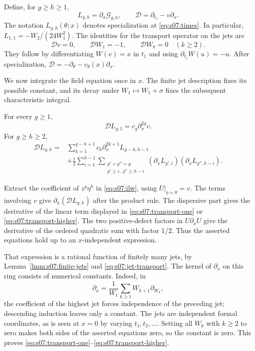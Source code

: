 Define, for $g\geq h\geq1$,
\begin{equation}\label{eq:s07:transport-definitions}
 L_{g,h}=\partial_x\mathcal G_{g,h},\qquad
 \mathscr D=\partial_{t_1}-v\partial_x.
\end{equation}
The notation $L_{g,h}(\theta;x)$ denotes specialization at
\eqref{eq:s07:times}. In particular,
$L_{1,1}=-W_2/(24W_1^2)$.
The identities for the transport operator on the jets are
\begin{equation}\label{eq:s07:jet-transport}
 \mathscr Dv=0,\qquad
 \mathscr DW_1=-1,\qquad \mathscr DW_k=0\quad(k\geq2).
\end{equation}
They follow by differentiating $W(v)=x$ in $t_1$ and using
$\partial_{t_1}W(u)=-u$. After specialization,
$\mathscr D=-\partial_\theta-v_\theta(x)\partial_x$.

We now integrate the field equation once in $x$. The finite jet
description fixes its possible constant, and its decay under
$W_1\mapsto W_1+\sigma$ fixes the subsequent characteristic integral.

\begin{prp}\label{prp:s07:transport}
For every $g\geq1$,
\begin{equation}\label{eq:s07:transport-one}
 \mathscr DL_{g,1}=c_g\partial_x^{2g}v.
\end{equation}
For $g\geq h\geq2$,
\begin{equation}\label{eq:s07:transport-higher}
 \begin{aligned}
 \mathscr DL_{g,h}
 ={}&\sum_{k=1}^{g-h+1}c_k\partial_x^{2k+1}L_{g-k,h-1}\\
 &+\frac12\sum_{i=1}^{h-1}
   \sum_{\substack{g'+g''=g\\g'\geq i,\ g''\geq h-i}}
       (\partial_xL_{g',i})(\partial_xL_{g'',h-i}).
 \end{aligned}
\end{equation}
\end{prp}
\begin{prf}
Extract the coefficient of $z^g\eta^h$ in
\eqref{eq:s07:ilw}, using $U|_{\eta=0}=v$. The terms involving
$v$ give $\partial_x(\mathscr DL_{g,h})$ after the product rule.
The dispersive part gives the derivative of the linear term displayed
in \eqref{eq:s07:transport-one} or
\eqref{eq:s07:transport-higher}. The two positive-defect factors
in $U\partial_xU$ give the derivative of the ordered quadratic sum
with factor $1/2$. Thus the asserted equations hold up to an
$x$-independent expression.

That expression is a rational function of finitely many jets, by
Lemma~\ref{lmm:s07:finite-jets} and
\eqref{eq:s07:jet-transport}. The kernel of $\partial_x$ on this
ring consists of numerical constants. Indeed, in
\[
 \partial_x=\frac1{W_1}\sum_{k\geq1}W_{k+1}\partial_{W_k},
\]
the coefficient of the highest jet forces independence of the
preceding jet; descending induction leaves only a constant.
The jets are independent formal coordinates, as is seen at $x=0$
by varying $t_1,t_2,\ldots$. Setting all $W_k$ with $k\geq2$ to
zero makes both sides of the asserted equations zero, so the
constant is zero. This proves
\eqref{eq:s07:transport-one}--\eqref{eq:s07:transport-higher}.
\end{prf}

